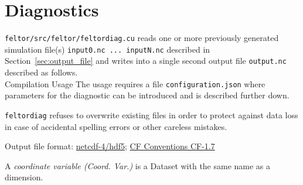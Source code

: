 \section{Diagnostics}\label{sec:diagnostics}
\texttt{feltor/src/feltor/feltordiag.cu}
reads one or more previously generated simulation file(s) \texttt{input0.nc ... inputN.nc}
described in Section~\ref{sec:output_file} and writes into a
 single second output file \texttt{output.nc} described as follows. \\
Compilation
\noindent Usage
The usage requires a file \texttt{configuration.json} where parameters for the diagnostic can be introduced and is described further down.
\begin{tcolorbox}[title=Note]
\texttt{feltordiag} refuses to overwrite existing files in order to protect against data loss in case of accidental spelling
errors or other careless mistakes.
\end{tcolorbox}

Output file format: \href{https://www.unidata.ucar.edu/software/netcdf/docs/}{netcdf-4/hdf5};
\href{http://cfconventions.org/Data/cf-conventions/cf-conventions-1.7/cf-conventions.html}{CF Conventions CF-1.7}

A \textit{coordinate variable (Coord. Var.)} is a Dataset with the same name as a dimension.

